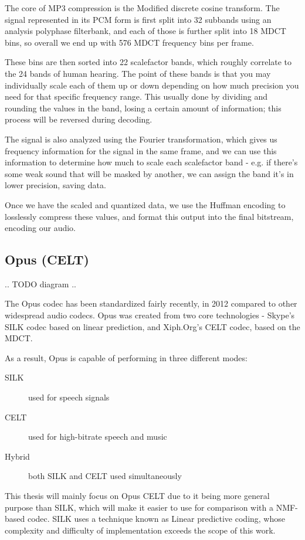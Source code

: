 The core of MP3 compression is the Modified discrete cosine transform. The signal represented in its PCM form is first split into 32 subbands using an analysis polyphase filterbank, and each of those is further split into 18 MDCT bins, so overall we end up with 576 MDCT frequency bins per frame.

These bins are then sorted into 22 scalefactor bands, which roughly correlate to the 24 bands of human hearing. The point of these bands is that you may individually scale each of them up or down depending on how much precision you need for that specific frequency range. This usually done by dividing and rounding the values in the band, losing a certain amount of information; this process will be reversed during decoding.

The signal is also analyzed using the Fourier transformation, which gives us frequency information for the signal in the same frame, and we can use this information to determine how much to scale each scalefactor band - e.g. if there's some weak sound that will be masked by another, we can assign the band it's in lower precision, saving data. \cite{wilburn_2007}

Once we have the scaled and quantized data, we use the Huffman encoding to losslessly compress these values, and format this output into the final bitstream, encoding our audio.

\subsection{Opus (CELT)}
.. TODO diagram ..

The Opus codec has been standardized fairly recently, in 2012 \cite{rfc6716} compared to other widespread audio codecs. Opus was created from two core technologies - Skype's SILK codec based on linear prediction, and Xiph.Org's CELT codec, based on the MDCT. \cite{opus_celt}

As a result, Opus is capable of performing in three different modes:

\begin{description}
	\item[SILK] used for speech signals
	\item[CELT] used for high-bitrate speech and music
	\item[Hybrid] both SILK and CELT used simultaneously
\end{description}

This thesis will mainly focus on Opus CELT due to it being more general purpose than SILK, which will make it easier to use for comparison with a NMF-based codec. SILK uses a technique known as Linear predictive coding, whose complexity and difficulty of implementation exceeds the scope of this work.


